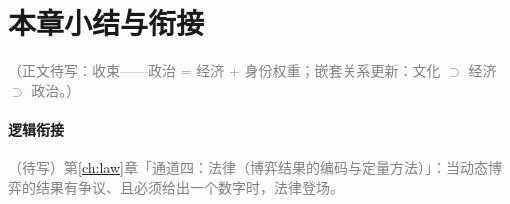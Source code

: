 \documentclass[../../main2.tex]{subfiles}
\begin{document}
	\section{本章小结与衔接}
	\label{sec:pol-summary}

	\textcolor{gray}{（正文待写：收束——政治 = 经济 + 身份权重；嵌套关系更新：文化 $\supset$ 经济 $\supset$ 政治。）}

	\paragraph*{逻辑衔接}
	\textcolor{gray}{（待写）第\ref{ch:law}章「通道四：法律（博弈结果的编码与定量方法）」：当动态博弈的结果有争议、且必须给出一个数字时，法律登场。}
\end{document}
